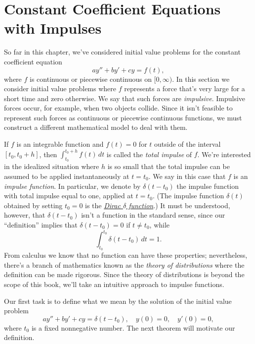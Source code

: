 \section{Constant Coefficient Equations with Impulses}

\noindent
So far in this chapter, we've considered initial value problems for the constant coefficient
equation
\[
  ay''+by'+cy=f(t),
\]
where $f$ is continuous or piecewise continuous on $[0,\infty)$. In this section we consider initial
value problems where $f$ represents a force that's very large for a short time and zero otherwise.
We say that such forces are {\color{blue}\it impulsive\/}. Impulsive forces occur, for example, when
two objects collide. Since it isn't feasible to represent such forces as continuous or piecewise
continuous functions, we must construct a different mathematical model to deal with them.

If $f$ is an integrable function and $f(t)=0$ for $t$ outside of the interval $[t_{0},t_{0}+h]$,
then $\int_{t_{0}}^{t_{0}+h}f(t)\,dt$ is called the {\color{blue}\it total impulse\/} of $f$. We're
interested in the idealized situation where $h$ is so small that the total impulse can be assumed to
be applied instantaneously at $t=t_{0}$. We say in this case that $f$ is an {\color{blue}\it impulse
function\/}. In particular, we denote by $\delta(t-t_{0})$ the impulse function with total impulse
equal to one, applied at $t=t_{0}$. (The impulse function $\delta(t)$ obtained by setting $t_{0}=0$
is the \href{https://mathshistory.st-andrews.ac.uk/Biographies/Dirac/}{\color{blue}
\it Dirac $\delta$ function\/}.) It must be understood, however, that $\delta(t-t_{0})$ isn't a
function in the standard sense, since our ``definition'' implies that $\delta(t-t_{0})=0$ if
$t\ne t_{0}$, while
\[
  \int_{t_{0}}^{t_{0}}\delta(t-t_{0})\,dt=1.
\]
From calculus we know that no function can have these properties; nevertheless, there's a branch of
mathematics known as the {\color{blue}\it theory of distributions\/} where the definition can be
made rigorous. Since the theory of distributions is beyond the scope of this book, we'll take an
intuitive approach to impulse functions.

Our first task is to define what we mean by the solution of the initial value problem
\[
  ay''+by'+cy=\delta(t-t_{0}),\quad y(0)=0,\quad y'(0)=0,
\]
where $t_{0}$ is a fixed nonnegative number. The next theorem will motivate our definition.

